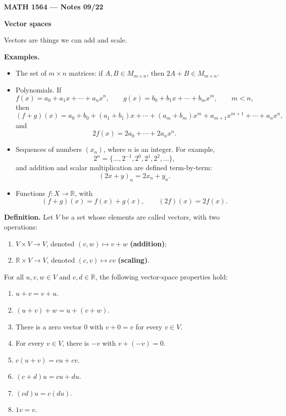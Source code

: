 \documentclass[letterpaper]{article}
\begin{document}
\textbf{MATH 1564 --- Notes 09/22}

\bigskip

\textbf{Vector spaces}

\medskip

Vectors are things we can add and scale.

\medskip

\textbf{Examples.}
\begin{itemize}
\item The set of $m\times n$ matrices: if $A,B\in M_{m\times n}$, then $2A+B\in M_{m\times n}$.
\item Polynomials. If
\[
f(x)=a_0+a_1x+\cdots+a_nx^n,
\qquad
g(x)=b_0+b_1x+\cdots+b_mx^m,
\qquad m<n,
\]
then
\[
(f+g)(x)=a_0+b_0+(a_1+b_1)x+\cdots+(a_m+b_m)x^m+a_{m+1}x^{m+1}+\cdots+a_nx^n,
\]
and
\[
2f(x)=2a_0+\cdots+2a_nx^n.
\]
\item Sequences of numbers $(x_n)$, where $n$ is an integer. For example,
\[
2^n=\{\ldots,2^{-1},2^0,2^1,2^2,\ldots\},
\]
and addition and scalar multiplication are defined term-by-term:
\[
(2x+y)_n=2x_n+y_n.
\]
\item Functions $f:X\to\mathbb{R}$, with
\[
(f+g)(x)=f(x)+g(x),
\qquad
(2f)(x)=2f(x).
\]
\end{itemize}

\newpage

\textbf{Definition.} Let $V$ be a set whose elements are called vectors, with two operations:
\begin{enumerate}
\item $V\times V\to V$, denoted $(v,w)\mapsto v+w$ \textbf{(addition)};
\item $\mathbb{R}\times V\to V$, denoted $(c,v)\mapsto cv$ \textbf{(scaling)}.
\end{enumerate}

\medskip

For all $u,v,w\in V$ and $c,d\in\mathbb{R}$, the following vector-space properties hold:
\begin{enumerate}
\item $u+v=v+u$.
\item $(u+v)+w=u+(v+w)$.
\item There is a zero vector $0$ with $v+0=v$ for every $v\in V$.
\item For every $v\in V$, there is $-v$ with $v+(-v)=0$.
\item $c(u+v)=cu+cv$.
\item $(c+d)u=cu+du$.
\item $(cd)u=c(du)$.
\item $1v=v$.
\end{enumerate}
\end{document}
